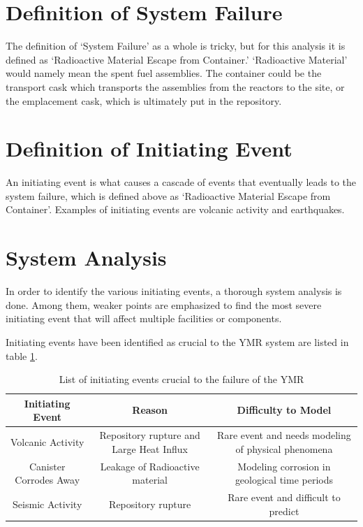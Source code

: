 \documentclass[12pt]{article}
\begin{document}
\section{Definition of System Failure}
The definition of `System Failure' as a whole is tricky, but for this analysis it is defined
as `Radioactive Material Escape from Container.'
`Radioactive Material' would namely mean the spent fuel assemblies.
The container could be the transport cask which transports the assemblies from
the reactors to the site, or the emplacement cask, which is ultimately put in the repository.

\section{Definition of Initiating Event}
An initiating event is what causes a cascade of events that eventually leads
to the system failure, which is defined above as `Radioactive Material Escape
from Container'. Examples of initiating events are volcanic activity and 
earthquakes.

\section{System Analysis}
In order to identify the various initiating events, a thorough system analysis
is done. Among them, weaker points are emphasized to find the most severe
initiating event that will affect multiple facilities or components. 

Initiating events have been identified as crucial to the 
\gls{YMR} system are listed in table \ref{tab:ie}.

\begin{table}[h]
    \centering
        \begin{tabular}{ccc}
            \hline
            \textbf{Initiating Event} & \textbf{Reason} & \textbf{Difficulty to Model} \\ \hline
            Volcanic Activity & Repository rupture and Large Heat Influx & Rare event and needs modeling of physical phenomena \\ 
            Canister Corrodes Away & Leakage of Radioactive material & Modeling corrosion in geological time periods \\
            Seismic Activity & Repository rupture & Rare event and difficult to predict \\ \hline
        \end{tabular}
        \caption{List of initiating events crucial to the failure of the \gls{YMR}}
        \label{tab:ie}
\end {table}
\end{document}
